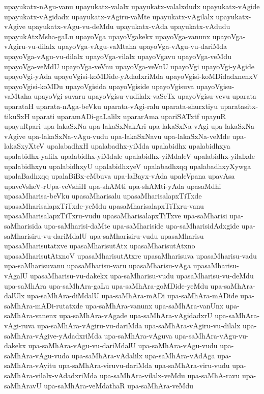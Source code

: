 {upayukatx-nAgu-vanu
upayukatx-valalx
upayukatx-valalxdudx
upayukatx-vAgide
upayukatx-vAgidadx
upayukatx-vAgiru-vaMte
upayukatx-vAgilalx
upayukatx-vAgive
upayukatx-vAgu-vu-deMdu
upayukatx-vAda
upayukatx-vAdudu
upayukAtxMsha-gaLu
upayoVga
upayoVgakekx
upayoVga-vanunx
upayoVga-vAgiru-vu-dilalx
upayoVga-vAgu-vaMtaha
upayoVga-vAgu-vu-dariMda
upayoVga-vAgu-vu-dilalx
upayoVga-vilalx
upayoVgavu
upayoVga-veMdu
upayoVga-veMdU
upayoVga-veVnu
upayoVga-veVnU
upayoVgi
upayoVgi-yAgide
upayoVgi-yAda
upayoVgisi-koMDide-yAdadxriMda
upayoVgisi-koMDidadxnenxV
upayoVgisi-koMDu
upayoVgisida
upayoVgiside
upayoVgisuva
upayoVgisu-vaMtaha
upayoVgi-suvaru
upayoVgisu-vudilalx-vaSeTx
upayoVgisu-vevu
uparata
uparataH
uparata-nAga-beVku
uparata-vAgi-ralu
uparata-shurxtiyu
uparatasitx-tikuSxH
uparati
uparamADi-gaLalilx
upararAma
upariSATxtf
upayuR
upayuRpari
upa-lakaSxNa
upa-lakaSxNakAri
upa-lakaSxNa-vAgi
upa-lakaSxNa-vAgive
upa-lakaSxNa-vAgu-vudu
upa-lakaSxNavu
upa-lakaSxNa-veMde
upa-lakaSxyXteV
upalabadhxH
upalabadhx-yiMda
upalabidhx
upalabidhxya
upalabidhx-yalilx
upalabidhx-yiMdale
upalabidhx-yiMdaleV
upalabidhx-yilalxde
upalabidhxyu
upalabidhxyU
upalabidhxyeV
upalabadhxqq
upalabadhxyXywga
upalaBadhxqq
upalaBiBx-eMbuva
upa-laBayx-vAda
upaleVpana
upavAsa
upaveVsheV-rUpa-veVshiH
upa-shAMti
upa-shAMti-yAda
upasaMdhi
upasaMharisa-beVku
upasaMharisalu
upasaMharisalapxTiTxde
upasaMharisalapxTiTxde-yeMdu
upasaMharisalapxTiTxru-vanu
upasaMharisalapxTiTxru-vudu
upasaMharisalapxTiTxve
upa-saMharisi
upa-saMharisida
upa-saMharisi-daMte
upa-saMhariside
upa-saMharisidAdxgide
upa-saMharisiru-vu-dariMdalU
upa-saMharisiru-vudu
upasaMharisu
upasaMharisutatxve
upasaMharisutAtx
upasaMharisutAtxno
upasaMharisutAtxnoV
upasaMharisutAtxre
upasaMharisuva
upasaMharisu-vadu
upa-saMharisuvanu
upasaMharisu-varu
upasaMharisu-vAga
upasaMharisu-vAgalU
upasaMharisu-vu-dakekx
upa-saMharisu-vudu
upasaMharisu-vu-deMdu
upa-saMhAra
upa-saMhAra-gaLu
upa-saMhAra-goMDide-yeMdu
upa-saMhAra-dalUlx
upa-saMhAra-diMdalU
upa-saMhAra-mADi
upa-saMhAra-mADide
upa-saMhAra-mADi-rutatxde
upa-saMhAra-vanunx
upa-saMhAra-vanUnx
upa-saMhAra-vanenx
upa-saMhAra-vAgade
upa-saMhAra-vAgidadxrU
upa-saMhAra-vAgi-ruva
upa-saMhAra-vAgiru-vu-dariMda
upa-saMhAra-vAgiru-vu-dilalx
upa-saMhAra-vAgive-yAdadxriMda
upa-saMhAra-vAguva
upa-saMhAra-vAgu-vu-dakekx
upa-saMhAra-vAgu-vu-dariMdalU
upa-saMhAra-vAgu-vudu
upa-saMhAra-vAgu-vudo
upa-saMhAra-vAdalilx
upa-saMhAra-vAdAga
upa-saMhAra-vAyitu
upa-saMhAra-viruvu-dariMda
upa-saMhAra-viru-vudu
upa-saMhAra-vilalx-vAdadxriMda
upa-saMhAra-vilalx-veMdu
upa-saMhA-ravu
upa-saMhAravU
upa-saMhAra-veMdathaR
upa-saMhAra-veMdu
}
